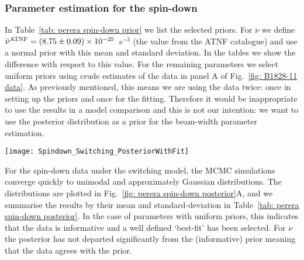 \documentclass[../full_thesis/full_thesis.tex]{subfiles}
\newcommand{\thisdir}{../comparing_periodic_modulations}
\newcommand{\bigfigurecaptions}[2]{
$\textbf{A}$: The estimated marginal posterior probability distribution for the
#1 #2 model parameters. $\textbf{B}$: Checking the fit of the model using the
maximum posterior values to the data; see Fig.~\ref{fig: noise-only beam-width
posterior fit} for a complete description.}
\begin{document}
\subsubsection{Parameter estimation for the spin-down}

In Table~\ref{tab: perera spin-down prior} we list the selected priors. For
$\ddot{\nu}$ we define
$\ddot{\nu}^{\tiny\mathrm{ATNF}}=(8.75\pm0.09)\times10^{-25}$~s$^{-3}$ (the
value from the ATNF catalogue) and use a normal prior with this mean and
standard deviation. In the tables we show the difference with respect to this
value. For the remaining parameters we select uniform priors using
crude estimates of the data in panel A of Fig.~\ref{fig: B1828-11 data}.
As previously mentioned, this means we are using the
data twice: once in setting up the priors and once for the fitting. Therefore
it would be inappropriate to use the results in a model comparison and this is
not our intention: we want to use the posterior distribution as a prior for the
beam-width parameter estimation.
\begin{table}
\centering
\caption{Prior distributions for the spin-down switching model.}
\label{tab: perera spin-down prior}

\end{table}

\begin{figure*}
\centering
\texttt{[image: Spindown\_Switching\_PosteriorWithFit]}
\caption{\bigfigurecaptions{Switching}{spin-down}}
\label{fig: perera spin-down posterior}
\end{figure*}

For the spin-down data under the switching model, the MCMC simulations converge
quickly to unimodal and approximately Gaussian distributions. The distributions are plotted
in Fig.~\ref{fig: perera spin-down posterior}A, and we summarise the results by
their mean and standard-deviation in Table~\ref{tab: perera spin-down
posterior}. In the case of parameters with uniform priors, this indicates that the data
is informative and a well defined `best-fit' has been selected. For $\ddot{\nu}$
the posterior has not departed significantly from the (informative) prior meaning that the
data agrees with the prior.
\begin{table}
\centering
\caption{Posterior estimates for the spin-down switching model.}
\label{tab: perera spin-down posterior}

\end{table}
\end{document}

